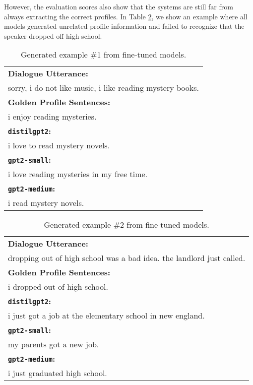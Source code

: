\documentclass[11pt]{article}
\begin{document}
However, the evaluation scores also show that the systems are still far from always extracting the correct profiles.
In Table \ref{tab:gen-results-2}, we show an example where all models generated unrelated profile information and failed to recognize that the speaker dropped off high school.

\begin{table}[h]
\centering
\begin{tabular}{p{\columnwidth}}
\toprule
\textbf{Dialogue Utterance:} \\
sorry, i do not like music, i like reading mystery books. \\
\midrule
\textbf{Golden Profile Sentences:} \\
i enjoy reading mysteries.\\
\midrule
\textbf{\texttt{distilgpt2}:} \\
i love to read mystery novels.
\\
\textbf{\texttt{gpt2-small}:} \\
i love reading mysteries in my free time.
\\
\textbf{\texttt{gpt2-medium}:} \\
i read mystery novels.
\\ \bottomrule
\end{tabular}
\caption{Generated example \#1 from fine-tuned models.}
\label{tab:gen-results-1}
\end{table}

\begin{table}[h!]
\centering
\begin{tabular}{p{\columnwidth}}
\toprule
\textbf{Dialogue Utterance:} \\
dropping out of high school was a bad idea. the landlord just called. \\
\midrule
\textbf{Golden Profile Sentences:} \\
i dropped out of high school.\\
\midrule
\textbf{\texttt{distilgpt2}:} \\
i just got a job at the elementary school in new england.
\\
\textbf{\texttt{gpt2-small}:} \\
my parents got a new job.
\\
\textbf{\texttt{gpt2-medium}:} \\
i just graduated high school.
\\ \bottomrule
\end{tabular}
\caption{Generated example \#2 from fine-tuned models.}
\label{tab:gen-results-2}
\end{table}
\end{document}

